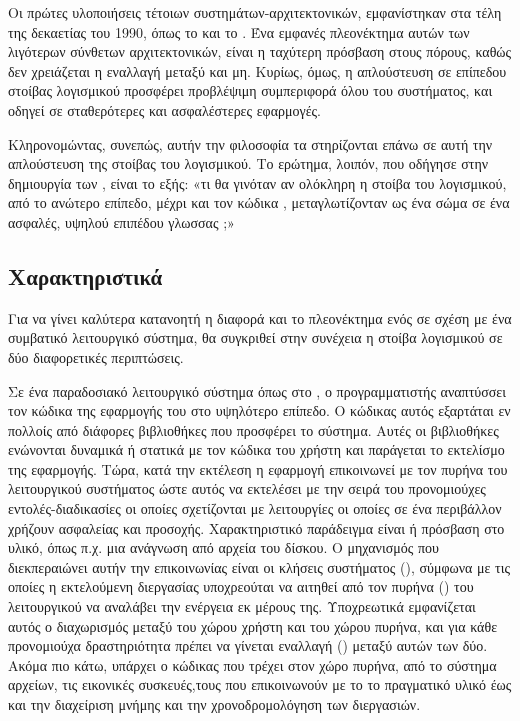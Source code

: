 Οι πρώτες υλοποιήσεις τέτοιων συστημάτων-αρχιτεκτονικών,
εμφανίστηκαν στα τέλη της δεκαετίας του 1990, όπως το 
και το \cite{riseOfVirtLibOS}. Ένα εμφανές πλεονέκτημα αυτών των
λιγότερων σύνθετων αρχιτεκτονικών, είναι η ταχύτερη πρόσβαση
στους πόρους, καθώς δεν χρειάζεται η εναλλαγή μεταξύ
 και μη. Κυρίως, όμως, η απλούστευση σε επίπεδου
στοίβας λογισμικού προσφέρει προβλέψιμη συμπεριφορά όλου του
συστήματος, και οδηγεί σε σταθερότερες και ασφαλέστερες εφαρμογές.
\newline

Κληρονομώντας, συνεπώς, αυτήν την φιλοσοφία τα  στηρίζονται
επάνω σε αυτή την απλούστευση της στοίβας του λογισμικού. Το
ερώτημα, λοιπόν, που οδήγησε στην δημιουργία των ,
είναι το εξής: «τι θα γινόταν αν ολόκληρη η στοίβα του λογισμικού,
από το ανώτερο επίπεδο, μέχρι και τον κώδικα ,
μεταγλωτίζονταν ως ένα σώμα σε ένα ασφαλές, υψηλού επιπέδου γλωσσας ;»







\subsection{Χαρακτηριστικά}

Για να γίνει καλύτερα κατανοητή η διαφορά και το πλεονέκτημα ενός
 σε σχέση με ένα συμβατικό λειτουργικό σύστημα, θα
συγκριθεί στην συνέχεια η στοίβα λογισμικού σε δύο διαφορετικές περιπτώσεις.
\newline

Σε ένα παραδοσιακό λειτουργικό σύστημα όπως στο , ο
προγραμματιστής αναπτύσσει τον κώδικα της εφαρμογής του στο
υψηλότερο επίπεδο. Ο κώδικας αυτός εξαρτάται εν πολλοίς από
διάφορες βιβλιοθήκες που προσφέρει το σύστημα. Αυτές οι
βιβλιοθήκες ενώνονται δυναμικά ή στατικά με τον κώδικα του χρήστη και παράγεται το
εκτελίσμο της εφαρμογής. Τώρα, κατά την εκτέλεση η εφαρμογή
επικοινωνεί με τον πυρήνα του λειτουργικού συστήματος ώστε αυτός
να εκτελέσει με την σειρά του προνομιούχες εντολές-διαδικασίες οι οποίες
σχετίζονται με λειτουργίες οι οποίες σε ένα 
περιβάλλον χρήζουν ασφαλείας και προσοχής. Χαρακτηριστικό παράδειγμα είναι
ή πρόσβαση στο υλικό, όπως π.χ. μια ανάγνωση από αρχεία του δίσκου. Ο μηχανισμός
που διεκπεραιώνει αυτήν την επικοινωνίας είναι οι κλήσεις συστήματος
(), σύμφωνα με τις οποίες η εκτελούμενη
διεργασίας υποχρεούται να αιτηθεί από τον
πυρήνα () του λειτουργικού να αναλάβει την ενέργεια εκ μέρους
της. Υποχρεωτικά εμφανίζεται αυτός ο διαχωρισμός
μεταξύ του χώρου χρήστη και του χώρου πυρήνα, και για κάθε
προνομιούχα δραστηριότητα πρέπει να γίνεται εναλλαγή () μεταξύ
αυτών των δύο. Ακόμα πιο κάτω, υπάρχει ο κώδικας που τρέχει
στον χώρο πυρήνα, από το σύστημα αρχείων, τις εικονικές
συσκευές,τους  που επικοινωνούν με το το πραγματικό υλικό
έως και την διαχείριση μνήμης και την χρονοδρομολόγηση των διεργασιών.
\newline

